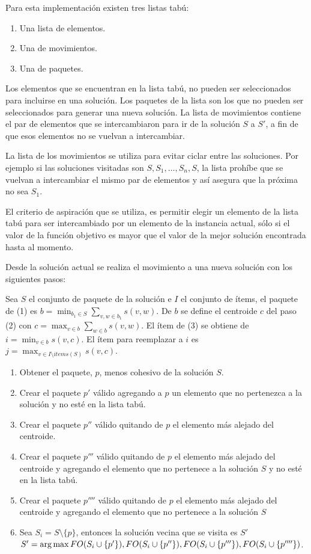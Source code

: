 Para esta implementación existen tres listas tabú: 
\begin{enumerate}
	\item Una lista de elementos.
	\item Una de movimientos.
	\item Una de paquetes.
\end{enumerate}

Los elementos que se encuentran en la lista tabú, no pueden ser seleccionados para incluirse en una solución. Los paquetes de la lista son los que no pueden ser seleccionados para generar una nueva solución. La lista de movimientos contiene el par de elementos que se intercambiaron para ir de la solución $S$ a $S'$, a fin de que esos elementos no se vuelvan a intercambiar.

La lista de los movimientos se utiliza para evitar ciclar entre las soluciones. Por ejemplo si las soluciones visitadas son $S, S_1, \ldots, S_n, S$, la lista prohíbe que se vuelvan a intercambiar el mismo par de elementos y así asegura que la próxima no sea $S_1$.

El criterio de aspiración que se utiliza, es permitir elegir un elemento de la lista tabú para ser intercambiado por un elemento de la instancia actual, sólo si el valor de la función objetivo es mayor que el valor de la mejor solución encontrada hasta al momento.

Desde la solución actual se realiza el movimiento a una nueva solución con los siguientes pasos:

Sea $S$ el conjunto de paquete de la solución e $I$ el conjunto de ítems, el paquete de (1) es $b = \min_{b_1 \in S}{\sum_{v,w \in b_1}{s(v,w)}}$. De $b$ se define el centroide $c$ del paso (2) con $c = \max_{v \in b}{\sum_{w \in b}{s(v,w)}}$. El ítem de (3) se obtiene de $i = \min_{v \in b}{s(v,c)}$. El ítem para reemplazar a $i$ es $j = \max_{v \in I \setminus items(S)}{s(v,c)}$.

\begin{enumerate}
	\item Obtener el paquete, $p$, menos cohesivo de la solución $S$.
	\item Crear el paquete $p'$ válido agregando a $p$ un elemento que no pertenezca a la solución y no esté en la lista tabú.
	\item Crear el paquete $p''$ válido quitando de $p$ el elemento más alejado del centroide.
	\item Crear el paquete $p'''$ válido quitando de $p$ el elemento más alejado del centroide y agregando el elemento que no pertenece a la solución $S$ y no esté en la lista tabú.
	\item Crear el paquete $p''''$ válido quitando de $p$ el elemento más alejado del centroide y agregando el elemento que no pertenece a la solución $S$
	\item Sea $S_{i} = S\setminus \{p\}$, entonces la solución vecina que se visita es $S'$\\
	$S' = \operatorname*{arg\,max} {FO(S_{i}\cup\{p'\}), FO(S_{i}\cup\{p''\}), FO(S_{i}\cup\{p'''\}), FO(S_{i}\cup\{p''''\})}$.
\end{enumerate}

